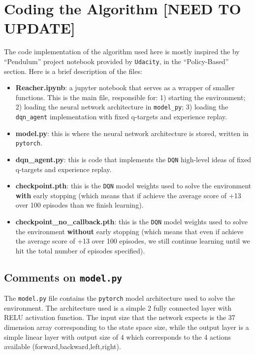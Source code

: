 \documentclass[
]{article}
\begin{document}
\hypertarget{coding-the-algorithm-need-to-update}{%
\section{Coding the Algorithm {[}NEED TO
UPDATE{]}}\label{coding-the-algorithm-need-to-update}}

The code implementation of the algorithm used here is mostly inspired
the by ``Pendulum'' project notebook provided by \texttt{Udacity}, in
the ``Policy-Based'' section. Here is a brief description of the files:

\begin{itemize}
\item
  \textbf{Reacher.ipynb}: a jupyter notebook that serves as a wrapper of
  smaller functions. This is the main file, responsible for: 1) starting
  the environment; 2) loading the neural network architecture in
  \texttt{model\_py}; 3) loading the \texttt{dqn\_agent} implementation
  with fixed q-targets and experience replay.
\item
  \textbf{model.py}: this is where the neural network architecture is
  stored, written in \texttt{pytorch}.
\item
  \textbf{dqn\_agent.py}: this is code that implements the \texttt{DQN}
  high-level ideas of fixed q-targets and experience replay.
\item
  \textbf{checkpoint.pth}: this is the \texttt{DQN} model weights used
  to solve the environment \textbf{with} early stopping (which means
  that if achieve the average score of +13 over 100 episodes than we
  finish learning).
\item
  \textbf{checkpoint\_no\_callback.pth}: this is the \texttt{DQN} model
  weights used to solve the environment \textbf{without} early stopping
  (which means that even if achieve the average score of +13 over 100
  episodes, we still continue learning until we hit the total number of
  episodes specified).
\end{itemize}

\hypertarget{comments-on-model.py}{%
\subsection{\texorpdfstring{Comments on
\texttt{model.py}}{Comments on model.py}}\label{comments-on-model.py}}

The \texttt{model.py} file contains the \texttt{pytorch} model
architecture used to solve the environment. The architecture used is a
simple 2 fully connected layer with RELU activation function. The input
size that the network expects is the 37 dimension array corresponding to
the state space size, while the output layer is a simple linear layer
with output size of 4 which corresponds to the 4 actions available
(forward,backward,left,right).
\end{document}
